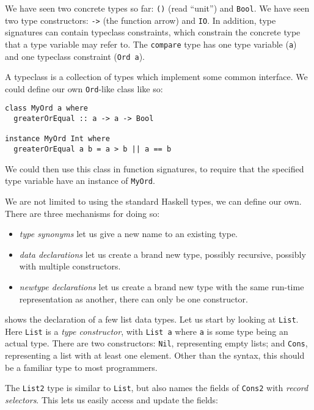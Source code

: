 We have seen two concrete types so far: \verb|()| (read ``unit'') and
\verb|Bool|.  We have seen two type constructors: \verb|->| (the function arrow)
and \verb|IO|.  In addition, type signatures can contain typeclass constraints,
which constrain the concrete type that a type variable may refer to.  The
\verb|compare| type has one type variable (\verb|a|) and one typeclass
constraint (\verb|Ord a|).

A typeclass is a collection of types which implement some common interface.  We
could define our own \verb|Ord|-like class like so:

\begin{verbatim}
class MyOrd a where
  greaterOrEqual :: a -> a -> Bool

instance MyOrd Int where
  greaterOrEqual a b = a > b || a == b
\end{verbatim}

We could then use this class in function signatures, to require that the
specified type variable have an instance of \verb|MyOrd|.

We are not limited to using the standard Haskell types, we can define our own.
There are three mechanisms for doing so:

\begin{itemize}
\item \emph{type synonyms} let us give a new name to an existing type.
\item \emph{data declarations} let us create a brand new type, possibly
  recursive, possibly with multiple constructors.
\item \emph{newtype declarations} let us create a brand new type with the same
  run-time representation as another, there can only be one constructor.
\end{itemize}

\begin{figure}
  \centering
  
  \label{fig:list}
  \hrulefill
\end{figure}

 shows the declaration of a few list data types.  Let us start by
looking at \verb|List|.  Here \verb|List| is a \emph{type constructor}, with
\verb|List a| where \verb|a| is some type being an actual type.  There are two
constructors: \verb|Nil|, representing empty lists; and \verb|Cons|,
representing a list with at least one element.  Other than the syntax, this
should be a familiar type to most programmers.

The \verb|List2| type is similar to \verb|List|, but also names the fields of
\verb|Cons2| with \emph{record selectors}.  This lets us easily access and
update the fields:


